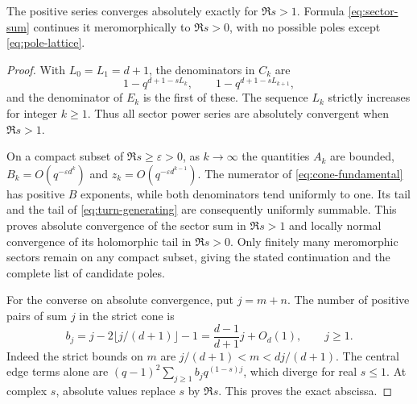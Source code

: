 \begin{proposition}\label{prop:convergence}
The positive series converges absolutely exactly for $\Re s>1$.
Formula \eqref{eq:sector-sum} continues it meromorphically to
$\Re s>0$, with no possible poles except \eqref{eq:pole-lattice}.
\end{proposition}
\begin{proof}
With $L_0=L_1=d+1$, the denominators in $C_k$ are
\[
 1-q^{d+1-sL_k},\qquad 1-q^{d+1-sL_{k+1}},
\]
and the denominator of $E_k$ is the first of these. The sequence
$L_k$ strictly increases for integer $k\ge1$. Thus all sector
power series are absolutely convergent when $\Re s>1$.

On a compact subset of $\Re s\ge\varepsilon>0$, as $k\to\infty$
the quantities $A_k$ are bounded,
$B_k=O(q^{-\varepsilon d^k})$ and
$z_k=O(q^{-\varepsilon d^{k-1}})$. The numerator of
\eqref{eq:cone-fundamental} has positive $B$ exponents, while
both denominators tend uniformly to one. Its tail and the tail
of \eqref{eq:turn-generating} are consequently uniformly summable.
This proves absolute convergence of the sector sum in
$\Re s>1$ and locally normal convergence of its holomorphic
tail in $\Re s>0$. Only finitely many meromorphic sectors
remain on any compact subset, giving the stated continuation
and the complete list of candidate poles.

For the converse on absolute convergence, put $j=m+n$.
The number of positive pairs of sum $j$ in the strict cone is
\begin{equation}\label{eq:b-j}
 b_j=j-2\lfloor j/(d+1)\rfloor-1
     =\frac{d-1}{d+1}j+O_d(1),\qquad j\ge1.
\end{equation}
Indeed the strict bounds on $m$ are
$j/(d+1)<m<dj/(d+1)$. The central edge terms alone are
$(q-1)^2\sum_{j\ge1}b_j q^{(1-s)j}$, which diverge for
real $s\le1$. At complex $s$, absolute values replace $s$
by $\Re s$. This proves the exact abscissa.
\end{proof}
